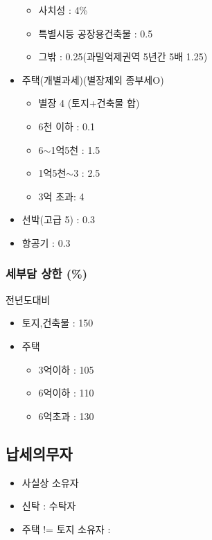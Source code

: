 \documentclass{oblivoir}
\begin{document}
\begin{multicols}{2}
\begin{itemize}
  \begin{itemize}
  \itemsep1pt\parskip0pt
  \item
    사치성 : 4\%
  \item
    특별시등 공장용건축물 : 0.5
  \item
    그밖 : 0.25(과밀억제권역 5년간 5배 1.25)
  \end{itemize}
\item
  주택(개별과세)(별장제외 종부세O)

  \begin{itemize}
  \itemsep1pt\parskip0pt
  \item
    별장 4 (토지+건축물 합)
  \item
    6천 이하 : 0.1
  \item
    6$\sim$1억5천 : 1.5
  \item
    1억5천$\sim$3 : 2.5
  \item
    3억 초과: 4
  \end{itemize}
\item
  선박(고급 5) : 0.3
\item
  항공기 : 0.3
\end{itemize}

\subsubsection{세부담 상한 (\%)}\label{uxc138uxbd80uxb2f4-uxc0c1uxd55c}

전년도대비

\begin{itemize}
\itemsep1pt\parskip0pt
\item
  토지,건축물 : 150
\item
  주택

  \begin{itemize}
  \itemsep1pt\parskip0pt
  \item
    3억이하 : 105
  \item
    6억이하 : 110
  \item
    6억초과 : 130
  \end{itemize}
\end{itemize}

\subsection{납세의무자}\label{uxb0a9uxc138uxc758uxbb34uxc790-2}

\begin{itemize}
\itemsep1pt\parskip0pt
\item
  사실상 소유자
\item
  신탁 : 수탁자
\item
  주택 != 토지 소유자 :
\end{itemize}


\end{multicols}
\end{document}
